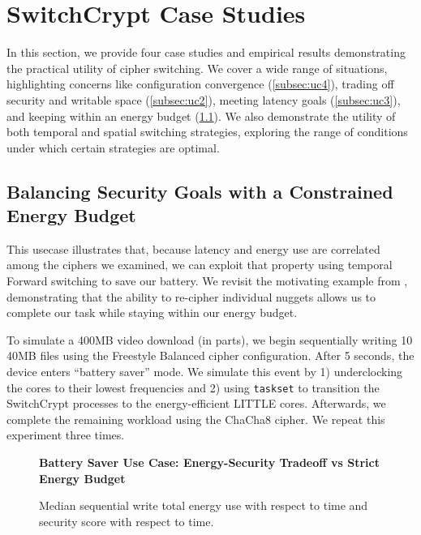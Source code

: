 \section{SwitchCrypt Case Studies} \label{sec:usecases}

In this section, we provide four case studies and empirical results
demonstrating the practical utility of cipher switching. We cover a wide range
of situations, highlighting concerns like configuration convergence
(\cref{subsec:uc4}), trading off security and writable space
(\cref{subsec:uc2}), meeting latency goals (\cref{subsec:uc3}), and keeping
within an energy budget (\cref{subsec:uc1}). We also demonstrate the utility of
both temporal and spatial switching strategies, exploring the range of
conditions under which certain strategies are optimal.

\subsection{Balancing Security Goals with a Constrained Energy Budget} \label{subsec:uc1}

This usecase illustrates that, because latency and energy use are correlated
among the ciphers we examined, we can exploit that property using temporal
Forward switching to save our battery. We revisit the motivating example from
, demonstrating that the ability to re-cipher individual
nuggets allows us to complete our task while staying within our energy budget.

To simulate a 400MB video download (in parts), we begin sequentially writing 10
40MB files using the Freestyle Balanced cipher configuration. After 5 seconds,
the device enters ``battery saver'' mode. We simulate this event by 1)
underclocking the cores to their lowest frequencies and 2) using
\texttt{taskset} to transition the SwitchCrypt processes to the energy-efficient
LITTLE cores. Afterwards, we complete the remaining workload using the ChaCha8
cipher. We repeat this experiment three times.

\begin{figure}[ht] \textbf{Battery Saver Use Case: Energy-Security Tradeoff vs
   Strict Energy Budget}\par\medskip
   \centering
   {} \caption{Median sequential write total
   energy use with respect to time and security score with respect to time.}
  \label{fig:usecase-battery}
\end{figure}

